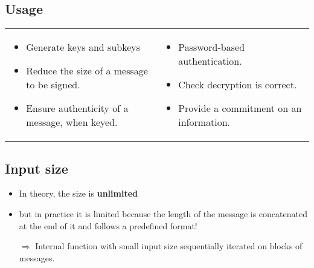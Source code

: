 

\subsection{Usage}
\begin{tabular}{m{0.5\linewidth}m{0.5\linewidth}}
    \begin{itemize} 
        \item Generate keys and subkeys
        \item Reduce the size of a message to be signed.
        \item Ensure authenticity of a message, when keyed.
    \end{itemize}
    &
    \begin{itemize} 
        \item Password-based authentication.
        \item Check decryption is correct.
        \item Provide a commitment on an information.
    \end{itemize}
\end{tabular}

\subsection{Input size}
\begin{itemize}
    \item In theory, the size is \textbf{unlimited} 
    \item but in practice it is limited
        because the length of the message is concatenated at the end of it and
        follows a predefined format!

    \item[$\Rightarrow$] Internal function with small input size sequentially iterated on
        blocks of messages.
\end{itemize}


